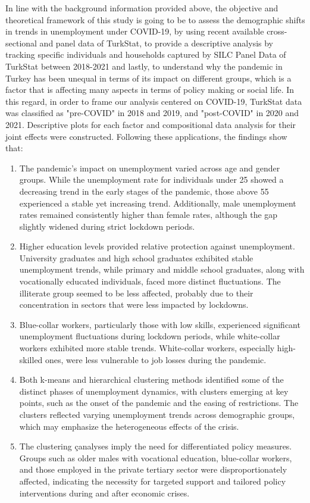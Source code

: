 \documentclass[a4paper,12pt]{article}
\begin{document}
\indent In line with the background information provided above, the objective and theoretical framework of this study is going to be to assess the demographic shifts in trends in unemployment under COVID-19, by using recent available cross-sectional and panel data of TurkStat, to provide a descriptive analysis by tracking specific individuals and households captured by SILC Panel Data of TurkStat between 2018-2021 and lastly, to understand why the pandemic in Turkey has been unequal in terms of its impact on different groups, which is a factor that is affecting many aspects in terms of policy making or social life. In this regard, in order to frame our analysis centered on COVID-19, TurkStat data was classified as "pre-COVID" in 2018 and 2019, and "post-COVID" in 2020 and 2021. Descriptive plots for each factor and compositional data analysis for their joint effects were constructed. Following these applications, the findings show that:
\begin{enumerate}
    \item The pandemic’s impact on unemployment varied across age and gender groups. While the unemployment rate for individuals under 25 showed a decreasing trend in the early stages of the pandemic, those above 55 experienced a stable yet increasing trend. Additionally, male unemployment rates remained consistently higher than female rates, although the gap slightly widened during strict lockdown periods.

    \item Higher education levels provided relative protection against unemployment. University graduates and high school graduates exhibited stable unemployment trends, while primary and middle school graduates, along with vocationally educated individuals, faced more distinct fluctuations. The illiterate group seemed to be less affected, probably due to their concentration in sectors that were less impacted by lockdowns.
    
    \item Blue-collar workers, particularly those with low skills, experienced significant unemployment fluctuations during lockdown periods, while white-collar workers exhibited more stable trends. White-collar workers, especially high-skilled ones, were less vulnerable to job losses during the pandemic.

    \item Both k-means and hierarchical clustering methods identified some of the distinct phases of unemployment dynamics, with clusters emerging at key points, such as the onset of the pandemic and the easing of restrictions. The clusters reflected varying unemployment trends across demographic groups, which may emphasize the heterogeneous effects of the crisis.

    \item The clustering çanalyses imply the need for differentiated policy measures. Groups such as older males with vocational education, blue-collar workers, and those employed in the private tertiary sector were disproportionately affected, indicating the necessity for targeted support and tailored policy interventions during and after economic crises.
    
\end{enumerate}
\end{document}
